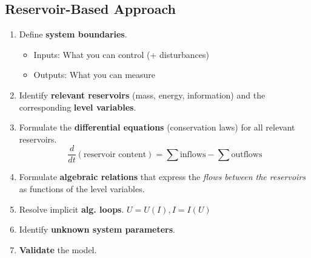 \subsection{Reservoir-Based Approach}
    \begin{enumerate}
        \item Define \textbf{system boundaries}.
        \begin{itemize}[label=-]
            \item Inputs: What you can control (+ disturbances)
            \item Outputs: What you can measure
        \end{itemize}
        \item Identify \textbf{relevant reservoirs} (mass, energy, information) and the corresponding \textbf{level variables}.
        \item Formulate the \textbf{differential equations} (conservation laws) for all relevant reservoirs.
        $$
            \frac{d}{dt} (\textrm{reservoir content}) = \sum \textrm{inflows} - \sum \textrm{outflows}
        $$
        \item Formulate \textbf{algebraic relations} that express the \textit{flows between the reservoirs} as functions of the level variables.
        \item Resolve implicit \textbf{alg. loops}. $U = U(I), I = I(U)$
        \item Identify \textbf{unknown system parameters}.
        \item \textbf{Validate} the model.
    \end{enumerate}